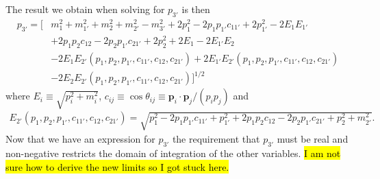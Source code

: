 The result we obtain when solving for $p_{3'}$ is then
\begin{equation}
\begin{aligned}
    p_{3'} = 
        \bigg[
            &m_1^2 + m_{1'}^2 + m_2^2 + m_{2'}^2 - m_{3'}^2 + 2 p_{1}^2 - 2 p_{1} p_{1'} c_{11'} + 2 p_{1'}^2 - 2 E_1 E_{1'} \\
            &+ 2 p_1 p_2 c_{12} - 2 p_{2} p_{1'} c_{21'} + 2 p_2^2 + 2 E_1 - 2 E_{1'} E_2 \\
            &- 2 E_1 E_{2'}(p_1, p_{2}, p_{1'}, c_{11'}, c_{12}, c_{21'})
            + 2 E_{1'} E_{2'}(p_1, p_{2}, p_{1'}, c_{11'}, c_{12}, c_{21'})\\
            &- 2 E_2 E_{2'}(p_1, p_{2}, p_{1'}, c_{11'}, c_{12}, c_{21'})
        \bigg]^{1/2}
\end{aligned}
\end{equation}
where $E_i \equiv \sqrt{p_i^2 + m_i^2}$, $c_{ij} \equiv \cos \theta_{ij} \equiv \bm{p}_i \cdot \bm{p}_j / (p_i p_j)$ and 
\begin{align}
    E_{2'}(p_1, p_{2}, p_{1'}, c_{11'}, c_{12}, c_{21'}) = \sqrt{p_1^2  - 2 p_1 p_{1'} c_{11'} + p_{1'}^2  + 2 p_{1} p_{2} c_{12} - 2 p_2 p_{1'} c_{21'} + p_2^2 + m_{2'}^2}.    
\end{align}
Now that we have an expression for $p_{3'}$ the requirement that $p_{3'}$ must be real and non-negative restricts the domain of integration of the other variables. 
\hl{I am not sure how to derive the new limits so I got stuck here.}


